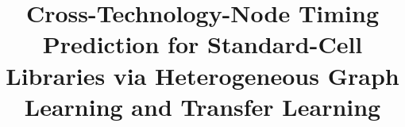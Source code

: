 \documentclass[sigconf]{acmart}
\begin{document}
\title{
    Cross-Technology-Node Timing Prediction for Standard-Cell Libraries via Heterogeneous Graph Learning and Transfer Learning
}






\maketitle

\pagestyle{empty}







{
     \small
     
     
}
\end{document}
